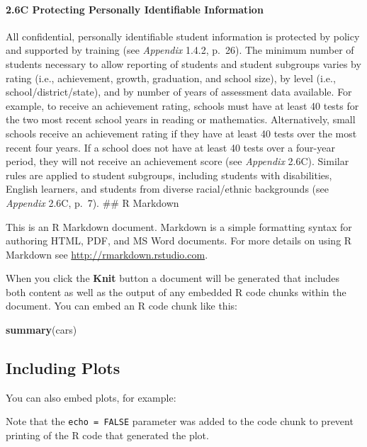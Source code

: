 \documentclass[]{article}
\newenvironment{Shaded}{\begin{snugshade}}{\end{snugshade}}
\newcommand{\KeywordTok}[1]{\textcolor[rgb]{0.13,0.29,0.53}{\textbf{#1}}}
\newcommand{\NormalTok}[1]{#1}
\let\oldparagraph\paragraph
\renewcommand{\paragraph}[1]{\oldparagraph{#1}\mbox{}}
\begin{document}
\hypertarget{c-protecting-personally-identifiable-information}{%
\paragraph{2.6C Protecting Personally Identifiable
Information}\label{c-protecting-personally-identifiable-information}}

All confidential, personally identifiable student information is
protected by policy and supported by training (see \emph{Appendix}
1.4.2, p.~26). The minimum number of students necessary to allow
reporting of students and student subgroups varies by rating (i.e.,
achievement, growth, graduation, and school size), by level (i.e.,
school/district/state), and by number of years of assessment data
available. For example, to receive an achievement rating, schools must
have at least 40 tests for the two most recent school years in reading
or mathematics. Alternatively, small schools receive an achievement
rating if they have at least 40 tests over the most recent four years.
If a school does not have at least 40 tests over a four-year period,
they will not receive an achievement score (see \emph{Appendix} 2.6C).
Similar rules are applied to student subgroups, including students with
disabilities, English learners, and students from diverse racial/ethnic
backgrounds (see \emph{Appendix} 2.6C, p.~7). \#\# R Markdown

This is an R Markdown document. Markdown is a simple formatting syntax
for authoring HTML, PDF, and MS Word documents. For more details on
using R Markdown see \url{http://rmarkdown.rstudio.com}.

When you click the \textbf{Knit} button a document will be generated
that includes both content as well as the output of any embedded R code
chunks within the document. You can embed an R code chunk like this:

\begin{Shaded}
\begin{Highlighting}[]
\KeywordTok{summary}\NormalTok{(cars)}
\end{Highlighting}
\end{Shaded}

\hypertarget{including-plots}{%
\subsection{Including Plots}\label{including-plots}}

You can also embed plots, for example:

Note that the \texttt{echo\ =\ FALSE} parameter was added to the code
chunk to prevent printing of the R code that generated the plot.
\end{document}
